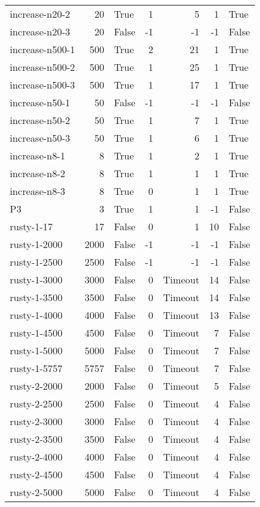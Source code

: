 \begin{longtable}{lrlrrrl}
increase-n20-2 & 20 & True & 1 & 5 & 1 & True \\
increase-n20-3 & 20 & False & -1 & -1 & -1 & False \\
increase-n500-1 & 500 & True & 2 & 21 & 1 & True \\
increase-n500-2 & 500 & True & 1 & 25 & 1 & True \\
increase-n500-3 & 500 & True & 1 & 17 & 1 & True \\
increase-n50-1 & 50 & False & -1 & -1 & -1 & False \\
increase-n50-2 & 50 & True & 1 & 7 & 1 & True \\
increase-n50-3 & 50 & True & 1 & 6 & 1 & True \\
increase-n8-1 & 8 & True & 1 & 2 & 1 & True \\
increase-n8-2 & 8 & True & 1 & 1 & 1 & True \\
increase-n8-3 & 8 & True & 0 & 1 & 1 & True \\
P3 & 3 & True & 1 & 1 & -1 & False \\
rusty-1-17 & 17 & False & 0 & 1 & 10 & False \\
rusty-1-2000 & 2000 & False & -1 & -1 & -1 & False \\
rusty-1-2500 & 2500 & False & -1 & -1 & -1 & False \\
rusty-1-3000 & 3000 & False & 0 & Timeout & 14 & False \\
rusty-1-3500 & 3500 & False & 0 & Timeout & 14 & False \\
rusty-1-4000 & 4000 & False & 0 & Timeout & 13 & False \\
rusty-1-4500 & 4500 & False & 0 & Timeout & 7 & False \\
rusty-1-5000 & 5000 & False & 0 & Timeout & 7 & False \\
rusty-1-5757 & 5757 & False & 0 & Timeout & 7 & False \\
rusty-2-2000 & 2000 & False & 0 & Timeout & 5 & False \\
rusty-2-2500 & 2500 & False & 0 & Timeout & 4 & False \\
rusty-2-3000 & 3000 & False & 0 & Timeout & 4 & False \\
rusty-2-3500 & 3500 & False & 0 & Timeout & 4 & False \\
rusty-2-4000 & 4000 & False & 0 & Timeout & 4 & False \\
rusty-2-4500 & 4500 & False & 0 & Timeout & 4 & False \\
rusty-2-5000 & 5000 & False & 0 & Timeout & 4 & False \\

\end{longtable}
